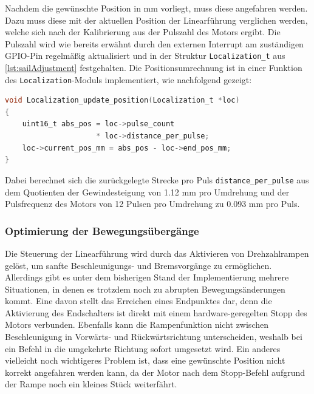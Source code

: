 \noindent
Nachdem die gewünschte Position in mm vorliegt, muss diese angefahren werden. Dazu muss diese mit der aktuellen Position der Linearführung verglichen werden, welche sich nach der Kalibrierung aus der Pulszahl des Motors ergibt. Die Pulszahl wird wie bereits erwähnt durch den externen Interrupt am zuständigen GPIO-Pin regelmäßig aktualisiert und in der Struktur \verb|Localization_t| aus \autoref{lst:sailAdjustment} festgehalten. Die Positionsumrechnung ist in einer Funktion des \verb|Localization|-Moduls implementiert, wie nachfolgend gezeigt:
\begin{lstlisting}[language=C, caption={Positionsberechnung aus dem Pulssignal des Motors}, label={lst:pulseToPos}]
void Localization_update_position(Localization_t *loc)
{
	uint16_t abs_pos = loc->pulse_count
	                 * loc->distance_per_pulse;
	loc->current_pos_mm = abs_pos - loc->end_pos_mm;
}
\end{lstlisting}
Dabei berechnet sich die zurückgelegte Strecke pro Puls \verb|distance_per_pulse| aus dem Quotienten der Gewindesteigung von 1.12 mm pro Umdrehung und der Pulsfrequenz des Motors von 12 Pulsen pro Umdrehung zu 0.093 mm pro Puls.
\subsubsection{Optimierung der Bewegungsübergänge}
Die Steuerung der Linearführung wird durch das Aktivieren von Drehzahlrampen gelöst, um sanfte Beschleunigungs- und Bremsvorgänge zu ermöglichen. Allerdings gibt es unter dem bisherigen Stand der Implementierung mehrere Situationen, in denen es trotzdem noch zu abrupten Bewegungsänderungen kommt. Eine davon stellt das Erreichen eines Endpunktes dar, denn die Aktivierung des Endschalters ist direkt mit einem hardware-geregelten Stopp des Motors verbunden. Ebenfalls kann die Rampenfunktion nicht zwischen Beschleunigung in Vorwärts- und Rückwärtsrichtung unterscheiden, weshalb bei ein Befehl in die umgekehrte Richtung sofort umgesetzt wird. Ein anderes vielleicht noch wichtigeres Problem ist, dass eine gewünschte Position nicht korrekt angefahren werden kann, da der Motor nach dem Stopp-Befehl aufgrund der Rampe noch ein kleines Stück weiterfährt.\\

